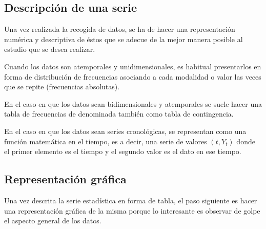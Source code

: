\documentclass[12pt]{report}
\begin{document}
\subsection{Descripción de una serie}

Una vez realizada la recogida de datos, se ha de hacer una representación numérica y
descriptiva de éstos que se adecue de la mejor manera posible al estudio que se desea
realizar.

Cuando los datos son atemporales  y  unidimensionales, es habitual presentarlos en forma
de distribución de frecuencias asociando a cada modalidad o valor las veces que se repite
(frecuencias absolutas).

 En el caso en que los datos sean
bidimensionales y atemporales se suele hacer una tabla de frecuencias de denominada
también como tabla de contingencia.

En el caso en que los datos sean series cronológicas, se representan como una función
matemática en el tiempo, es a decir, una serie de valores $(t, Y_t)$ donde el primer
elemento es el tiempo y  el segundo valor es el dato en ese tiempo.

\subsection{Representación gráfica}

Una vez descrita la serie estadística en forma de tabla, el paso siguiente es
 hacer una representación gráfica de la misma porque lo interesante es observar de golpe
 el aspecto general de los datos.
\end{document}
